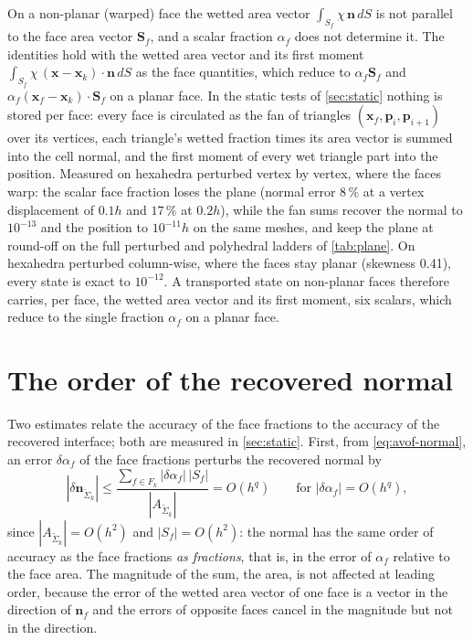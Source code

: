 \documentclass[preprint,12pt]{elsarticle}
\newcommand{\x}{\mathbf{x}}
\newcommand{\n}{\mathbf{n}}
\newcommand{\Sf}{\mathbf{S}_f}
\newcommand{\nSk}{\mathbf{n}_{\tilde{\Sigma}_k}}
\newcommand{\ASk}{A_{\tilde{\Sigma}_k}}
\begin{document}
On a non-planar (warped) face the wetted area vector $\int_{S_f}\chi\,\n\,dS$ is not parallel to the face area vector $\Sf$, and a scalar fraction $\alpha_f$ does not determine it. The identities hold with the wetted area vector and its first moment $\int_{S_f}\chi\,(\x - \x_k)\cdot\n\,dS$ as the face quantities, which reduce to $\alpha_f\Sf$ and $\alpha_f(\x_f - \x_k)\cdot\Sf$ on a planar face. In the static tests of \cref{sec:static} nothing is stored per face: every face is circulated as the fan of triangles $(\x_f, \mathbf{p}_i, \mathbf{p}_{i+1})$ over its vertices, each triangle's wetted fraction times its area vector is summed into the cell normal, and the first moment of every wet triangle part into the position. Measured on hexahedra perturbed vertex by vertex, where the faces warp: the scalar face fraction loses the plane (normal error $8\,\%$ at a vertex displacement of $0.1h$ and $17\,\%$ at $0.2h$), while the fan sums recover the normal to $10^{-13}$ and the position to $10^{-11}h$ on the same meshes, and keep the plane at round-off on the full perturbed and polyhedral ladders of \cref{tab:plane}. On hexahedra perturbed column-wise, where the faces stay planar (skewness 0.41), every state is exact to $10^{-12}$. A transported state on non-planar faces therefore carries, per face, the wetted area vector and its first moment, six scalars, which reduce to the single fraction $\alpha_f$ on a planar face.

\section{The order of the recovered normal}
\label{sec:order}

Two estimates relate the accuracy of the face fractions to the accuracy of the recovered interface; both are measured in \cref{sec:static}. First, from \cref{eq:avof-normal}, an error $\delta\alpha_f$ of the face fractions perturbs the recovered normal by
\begin{equation}
|\delta\nSk| \le \frac{\sum_{f \in F_k}|\delta\alpha_f|\,|S_f|}{|\ASk|} = O(h^q) \qquad\text{for } |\delta\alpha_f| = O(h^q),
\label{eq:normal-propagation}
\end{equation}
since $|\ASk| = O(h^2)$ and $|S_f| = O(h^2)$: the normal has the same order of accuracy as the face fractions \emph{as fractions}, that is, in the error of $\alpha_f$ relative to the face area. The magnitude of the sum, the area, is not affected at leading order, because the error of the wetted area vector of one face is a vector in the direction of $\n_f$ and the errors of opposite faces cancel in the magnitude but not in the direction.
\end{document}
